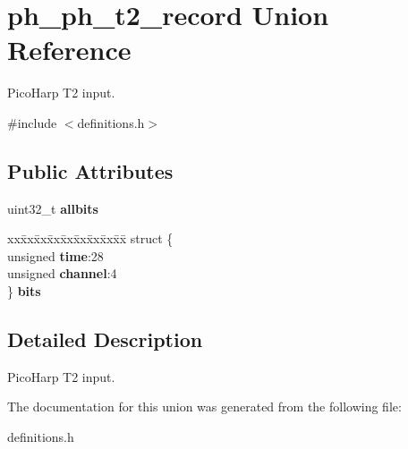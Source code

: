 \hypertarget{unionph__ph__t2__record}{}\section{ph\+\_\+ph\+\_\+t2\+\_\+record Union Reference}
\label{unionph__ph__t2__record}


Pico\+Harp T2 input.  




{\ttfamily \#include $<$definitions.\+h$>$}

\subsection*{Public Attributes}
\begin{DoxyCompactItemize}
\item 
\mbox{\label{unionph__ph__t2__record_a61b0e822d876f6f7f9a704f0de75067d}} 
uint32\+\_\+t {\bfseries allbits}
\item 
\mbox{\label{unionph__ph__t2__record_a35b47a885391216fb04f4a7710463030}} 
\begin{tabbing}
xx\=xx\=xx\=xx\=xx\=xx\=xx\=xx\=xx\=\kill
struct \{\\
\>unsigned {\bfseries time}:28\\
\>unsigned {\bfseries channel}:4\\
\} {\bfseries bits}\\

\end{tabbing}\end{DoxyCompactItemize}


\subsection{Detailed Description}
Pico\+Harp T2 input. 

The documentation for this union was generated from the following file\+:\begin{DoxyCompactItemize}
\item 
definitions.\+h\end{DoxyCompactItemize}
